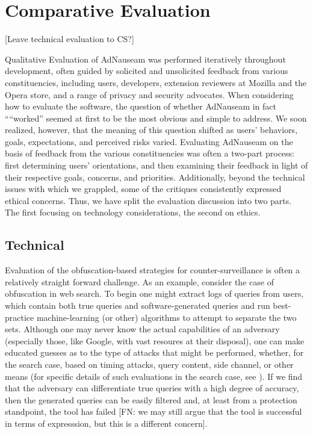 \documentclass[conference]{IEEEtran}
\begin{document}
\section{Comparative Evaluation}

[Leave technical evaluation to CS?]

Qualitative Evaluation of AdNauseam was performed iteratively throughout development, often guided by solicited and unsolicited feedback from various constituencies, including users, developers, extension reviewers at Mozilla and the Opera store, and a range of privacy and security advocates. When considering how to evaluate the software, the question of whether AdNauseam in fact ““worked” seemed at first to be the most obvious and simple to address. We soon realized, however, that the meaning of this question shifted as users' behaviors, goals, expectations, and perceived risks varied. Evaluating AdNauseam on the basis of feedback from the various constituencies was often a two-part process: first determining users' orientations, and then examining their feedback in light of their respective goals, concerns, and priorities. Additionally, beyond the technical issues with which we grappled, some of the critiques consistently expressed ethical concerns. Thus, we have split the evaluation discussion into two parts. The first focusing on technology considerations, the second on ethics.

\subsection{Technical}

Evaluation of the obfuscation-based strategies for counter-surveillance is often a relatively straight forward challenge. As an example, consider the case of obfuscation in web search. To begin one might extract logs of queries from users, which contain both true queries and software-generated queries and run best-practice machine-learning (or other) algorithms to attempt to separate the two sets. Although one may never know the actual capabilities of an adversary (especially those, like Google, with vast resoures at their disposal), one can make educated guesses as to the type of attacks that might be performed, whether, for the search case, based on timing attacks, query content, side channel, or other means (for specific details of such evaluations in the search case, see \cite{Gervais,Balsa,Peddinti}).  If we find that the adversary can differentiate true queries with a high degree of accuracy, then the generated queries can be easily filtered  and, at least from a protection standpoint, the tool has failed [FN: we may still argue that the tool is successful in terms of expresssion, but this is a different concern].
\end{document}
